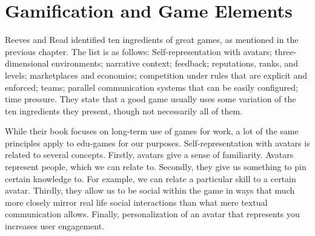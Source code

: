 
\section{Gamification and Game Elements}

Reeves and Read\citep{Reeves} identified ten ingredients of great games, as mentioned in the previous chapter. The list is as follows: Self-representation with avatars; three-dimensional environments; narrative context; feedback; reputations, ranks, and levels; marketplaces and economies; competition under rules that are explicit and enforced; teams; parallel communication systems that can be easily configured; time pressure. They state that a good game usually uses some variation of the ten ingredients they present, though not necessarily all of them.

While their book focuses on long-term use of games for work, a lot of the same principles apply to edu-games for our purposes. Self-representation with avatars is related to several concepts. Firstly, avatars give a sense of familiarity. Avatars represent people, which we can relate to. Secondly, they give us something to pin certain knowledge to. For example, we can relate a particular skill to a certain avatar. Thirdly, they allow us to be social within the game in ways that much more closely mirror real life social interactions than what mere textual communication allows. Finally, personalization of an avatar that represents you increases user engagement.



